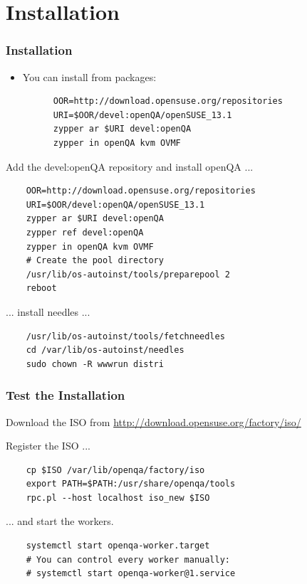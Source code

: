 \documentclass{beamer}
\begin{document}
\section{Installation}
%
%
\begin{frame}[fragile]
  \frametitle{Installation}
  \begin{itemize}
  \item You can install from packages:
    \lstset{style=mybash}
    \begin{lstlisting}
      OOR=http://download.opensuse.org/repositories
      URI=$OOR/devel:openQA/openSUSE_13.1
      zypper ar $URI devel:openQA
      zypper in openQA kvm OVMF
    \end{lstlisting}
    
  \end{itemize}
  Add the devel:openQA repository and install openQA ...
  \lstset{style=mybash}
  \begin{lstlisting}
    OOR=http://download.opensuse.org/repositories
    URI=$OOR/devel:openQA/openSUSE_13.1
    zypper ar $URI devel:openQA
    zypper ref devel:openQA
    zypper in openQA kvm OVMF
    # Create the pool directory
    /usr/lib/os-autoinst/tools/preparepool 2
    reboot
  \end{lstlisting}

  ... install needles ...
  \lstset{style=mybash}
  \begin{lstlisting}
    /usr/lib/os-autoinst/tools/fetchneedles
    cd /var/lib/os-autoinst/needles
    sudo chown -R wwwrun distri
  \end{lstlisting}
\end{frame}

%
%
\begin{frame}[fragile]
  \frametitle{Test the Installation}
  Download the ISO from
  \url{http://download.opensuse.org/factory/iso/}\newline

  Register the ISO ...
  \lstset{style=mybash}
  \begin{lstlisting}
    cp $ISO /var/lib/openqa/factory/iso
    export PATH=$PATH:/usr/share/openqa/tools
    rpc.pl --host localhost iso_new $ISO
  \end{lstlisting}

  ... and start the workers.
  \lstset{style=mybash}
  \begin{lstlisting}
    systemctl start openqa-worker.target
    # You can control every worker manually:
    # systemctl start openqa-worker@1.service
  \end{lstlisting}
\end{frame}
\end{document}
